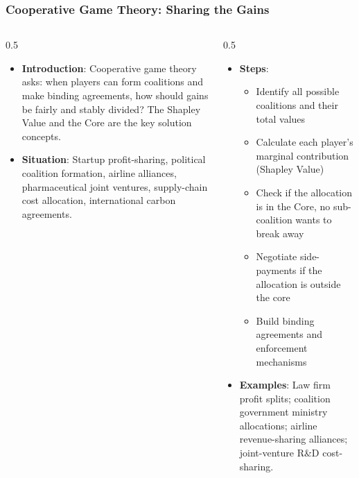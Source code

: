 \begin{frame}[fragile]\frametitle{Cooperative Game Theory: Sharing the Gains}
\begin{columns}
    \begin{column}[T]{0.5\linewidth}
      \begin{itemize}
        \item \textbf{Introduction}: Cooperative game theory asks: when players can form coalitions and make binding agreements, how should gains be fairly and stably divided? The Shapley Value and the Core are the key solution concepts.
        \item \textbf{Situation}: Startup profit-sharing, political coalition formation, airline alliances, pharmaceutical joint ventures, supply-chain cost allocation, international carbon agreements.
      \end{itemize}
    \end{column}
    \begin{column}[T]{0.5\linewidth}
      \begin{itemize}
        \item \textbf{Steps}:
        \begin{itemize}
          \item Identify all possible coalitions and their total values
          \item Calculate each player's marginal contribution (Shapley Value)
          \item Check if the allocation is in the Core, no sub-coalition wants to break away
          \item Negotiate side-payments if the allocation is outside the core
          \item Build binding agreements and enforcement mechanisms
        \end{itemize}\item \textbf{Examples}: Law firm profit splits; coalition government ministry allocations; airline revenue-sharing alliances; joint-venture R\&D cost-sharing.
      \end{itemize}
    \end{column}
  \end{columns}
\end{frame}


